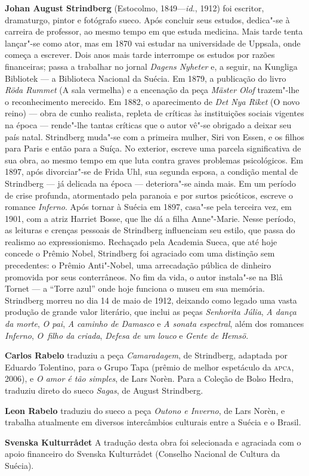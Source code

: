 {\noindent\textbf{Johan August Strindberg} (Estocolmo, 1849---\textit{id.}, 1912) 
foi escritor, dramaturgo, pintor e fotógrafo sueco. Após concluir
seus estudos, dedica"-se à carreira de professor, ao mesmo tempo em que
estuda medicina. Mais tarde tenta lançar"-se como ator, mas em 1870 vai
estudar na universidade de Uppsala, onde começa a escrever. Dois anos
mais tarde interrompe os estudos por razões financeiras; passa a
trabalhar no jornal \textit{Dagens Nyheter} e, a seguir, na
Kungliga Bibliotek --- a Biblioteca Nacional da Suécia.
Em 1879, a publicação do livro \textit{Röda Rummet} (A sala vermelha) e
a encenação da peça \textit{Mäster Olof} trazem"-lhe o reconhecimento
merecido. Em 1882, o aparecimento de \textit{Det Nya Riket} (O novo
reino) --- obra de cunho realista, repleta de críticas às instituições
sociais vigentes na época --- rende"-lhe tantas críticas que o autor vê"-se
obrigado a deixar seu país natal. Strindberg muda"-se com a primeira
mulher, Siri von Essen, e os filhos para Paris e então para a Suíça. No
exterior, escreve uma parcela significativa de sua obra, ao mesmo tempo
em que luta contra graves problemas psicológicos. Em 1897, após
divorciar"-se de Frida Uhl, sua segunda esposa, a condição mental de
Strindberg --- já delicada na época --- deteriora"-se ainda mais. Em um
período de crise profunda, atormentado pela paranoia e por surtos
psicóticos, escreve o romance \textit{Inferno}. Após tornar à Suécia em
1897, casa"-se pela terceira vez, em 1901, com a atriz Harriet Bosse,
que lhe dá a filha Anne"-Marie. Nesse período, as leituras e crenças
pessoais de Strindberg influenciam seu estilo, que passa do realismo ao
expressionismo. Rechaçado pela Academia Sueca, que até 
hoje concede o Prêmio Nobel, Strindberg foi agraciado com uma 
distinção sem precedentes: o Prêmio Anti"-Nobel, uma arrecadação 
pública de dinheiro promovida por seus conterrâneos. 
No fim da vida, o autor instala"-se na Blå Tornet --- a “Torre azul” 
onde hoje funciona o museu em sua memória.
Strindberg morreu no dia 14 de maio de 1912, deixando como legado uma
vasta produção de grande valor literário, que inclui as peças
\textit{Senhorita Júlia}, \textit{A dança da morte}, \textit{O pai},
\textit{A caminho de Damasco} e \textit{A sonata espectral}, além dos
romances \textit{Inferno}, \textit{O~filho da criada}, \textit{Defesa
de um louco} e \textit{Gente de Hemsö}. 

\noindent\textbf{Carlos Rabelo} traduziu a peça \textit{Camaradagem},
de Strindberg, adaptada por Eduardo Tolentino, para o Grupo Tapa (prêmio de
melhor espetáculo da \textsc{apca}, 2006), e \textit{O amor é tão simples}, de
Lars Norèn. Para a Coleção de Bolso Hedra, traduziu direto do sueco
\textit{Sagas}, de August Strindberg.

\noindent\textbf{Leon Rabelo} traduziu do sueco a peça \textit{Outono e Inverno}, de Lars Norèn, 
e trabalha atualmente em diversos intercâmbios culturais entre a Suécia e o Brasil.

\noindent\textbf{Svenska Kulturrådet} A tradução desta obra foi selecionada e agraciada com o apoio financeiro do Svenska Kulturrådet 
(Conselho Nacional de Cultura da Suécia).


}


